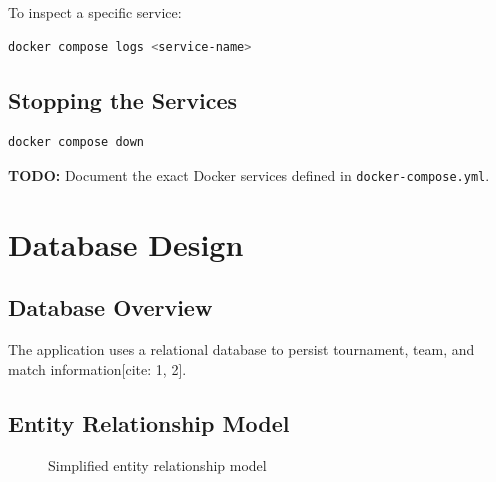 \documentclass[12pt,a4paper]{article}
\begin{document}
To inspect a specific service:

\begin{lstlisting}[language=bash]
docker compose logs <service-name>
\end{lstlisting}

\subsection{Stopping the Services}

\begin{lstlisting}[language=bash]
docker compose down
\end{lstlisting}

\textbf{TODO:} Document the exact Docker services defined in
\texttt{docker-compose.yml}.


\section{Database Design}

\subsection{Database Overview}

The application uses a relational database to persist tournament,
team, and match information[cite: 1, 2].

\subsection{Entity Relationship Model}

\begin{figure}[H]
\centering


\caption{Simplified entity relationship model}
\label{fig:erd}

\end{figure}
\end{document}
